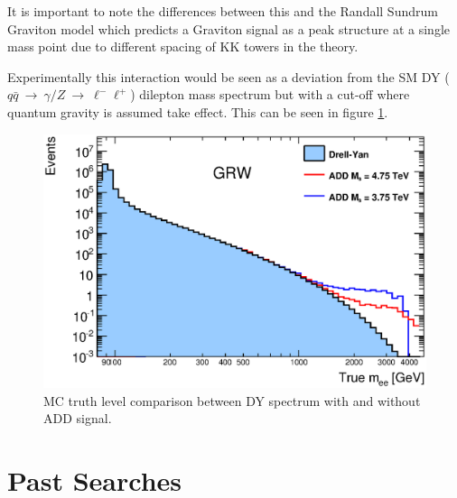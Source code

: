         It is important to note the differences between this and the Randall Sundrum \cite{PhysRevLett.83.3370} Graviton model which predicts a Graviton signal as a peak structure at a single mass point due to different spacing of KK towers in the theory.

        Experimentally this interaction would be seen as a deviation from the SM DY ($q\bar{q}~\rightarrow~\gamma/Z~\rightarrow~\ell^{-}\ell^{+}$) dilepton mass spectrum but with a cut-off where quantum gravity is assumed take effect. This can be seen in figure \ref{fig:theoryInvMassADD}.

        \begin{figure}[h]
            \begin{center}
            \includegraphics[width=0.9\linewidth]{images/truth_mass_ADD.eps}
            \end{center}
            \caption{MC truth level comparison between DY spectrum with and without ADD signal.}
            \label{fig:theoryInvMassADD}
        \end{figure}



\section{Past Searches}

